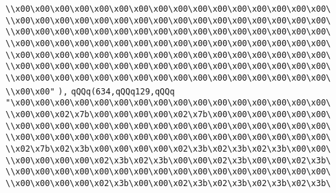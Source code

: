 \verb|\\x00\x00\x00\x00\x00\x00\x00\x00\x00\x00\x00\x00\x00\x00\x00\x00\|\newline
\verb|\\x00\x00\x00\x00\x00\x00\x00\x00\x00\x00\x00\x00\x00\x00\x00\x00\|\newline
\verb|\\x00\x00\x00\x00\x00\x00\x00\x00\x00\x00\x00\x00\x00\x00\x00\x00\|\newline
\verb|\\x00\x00\x00\x00\x00\x00\x00\x00\x00\x00\x00\x00\x00\x00\x00\x00\|\newline
\verb|\\x00\x00\x00\x00\x00\x00\x00\x00\x00\x00\x00\x00\x00\x00\x00\x00\|\newline
\verb|\\x00\x00\x00\x00\x00\x00\x00\x00\x00\x00\x00\x00\x00\x00\x00\x00\|\newline
\verb|\\x00\x00\x00\x00\x00\x00\x00\x00\x00\x00\x00\x00\x00\x00\x00\x00\|\newline
\verb|\\x00\x00"|\newline
\verb|),|\newline
\verb|qQQq(634,qQQq129,qQQq|\newline
\verb|"\x00\x00\x00\x00\x00\x00\x00\x00\x00\x00\x00\x00\x00\x00\x00\x00\|\newline
\verb|\\x00\x00\x02\x7b\x00\x00\x00\x00\x02\x7b\x00\x00\x00\x00\x00\x00\|\newline
\verb|\\x00\x00\x00\x00\x00\x00\x00\x00\x00\x00\x00\x00\x00\x00\x00\x00\|\newline
\verb|\\x00\x00\x00\x00\x00\x00\x00\x00\x00\x00\x00\x00\x00\x00\x00\x00\|\newline
\verb|\\x02\x7b\x02\x3b\x00\x00\x00\x00\x02\x3b\x02\x3b\x02\x3b\x00\x00\|\newline
\verb|\\x00\x00\x00\x00\x02\x3b\x02\x3b\x00\x00\x02\x3b\x00\x00\x02\x3b\|\newline
\verb|\\x00\x00\x00\x00\x00\x00\x00\x00\x00\x00\x00\x00\x00\x00\x00\x00\|\newline
\verb|\\x00\x00\x00\x00\x02\x3b\x00\x00\x02\x3b\x02\x3b\x02\x3b\x02\x3b\|\newline

